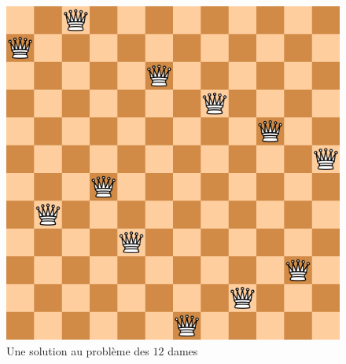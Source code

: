 \documentclass[a4paper,11pt]{article}
\begin{document}
        
        \begin{figure}
        \centering
        \includegraphics[scale=0.3]{board.png}
        \caption{Une solution au problème des $12$ dames}
        \end{figure}
	
	
\end{document}
